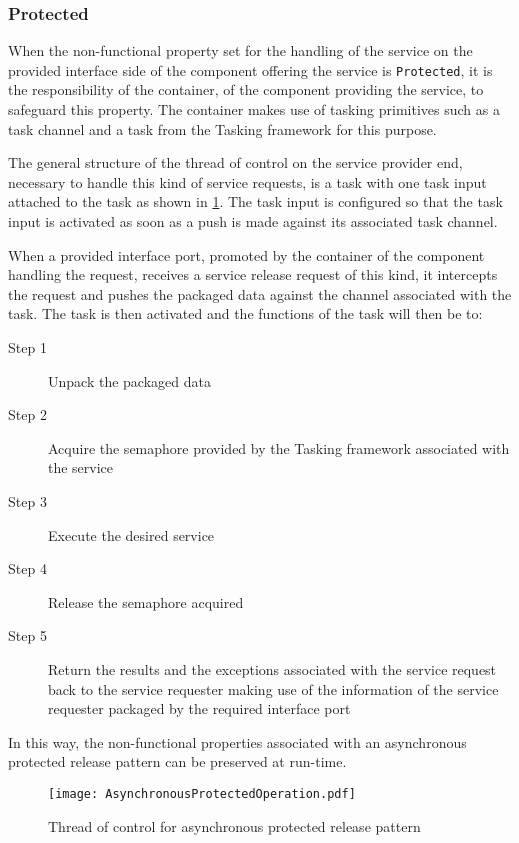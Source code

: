 \subsubsection{\textbf{Protected}}
When the non-functional property set for the handling of the service on the provided interface side of the component offering the service is \texttt{Protected}, it is the responsibility of the container, of the component providing the service, to safeguard this property. The container makes use of tasking primitives such as a task channel and a task from the Tasking framework for this purpose. 

The general structure of the thread of control on the service provider end, necessary to handle this kind of service requests, is a task with one task input attached to the task as shown in \cref{fig: Asynchronous protected}. The task input is configured so that the task input is activated as soon as a push is made against its associated task channel.  

When a provided interface port, promoted by the container of the component handling the request, receives a service release request of this kind, it intercepts the request and pushes the packaged data against the channel associated with the task. The task is then activated and the functions of the task will then be to:

\begin{description}
\item [Step 1] Unpack the packaged data
\item [Step 2] Acquire the semaphore provided by the Tasking framework associated with the service
\item [Step 3] Execute the desired service
\item [Step 4] Release the semaphore acquired 
\item [Step 5] Return the results and the exceptions associated with the service request back to the service requester making use of the information of the service requester packaged by the required interface port 
\end{description}

In this way, the non-functional properties associated with an asynchronous protected release pattern can be preserved at run-time.

\begin{figure}[h]
	\centering
	\texttt{[image: AsynchronousProtectedOperation.pdf]}
	\caption{Thread of control for asynchronous protected release pattern}
	\label{fig: Asynchronous protected}
\end{figure}

